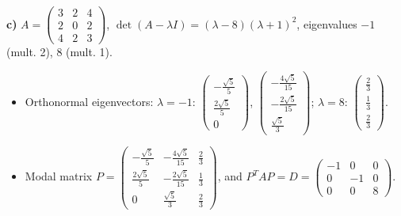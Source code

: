 \noindent\textbf{c)} $A=\begin{pmatrix}3 & 2 & 4 \\ 2 & 0 & 2 \\ 4 & 2 & 3\end{pmatrix}$, $\det(A-\lambda I)=\left(\lambda - 8\right) \left(\lambda + 1\right)^{2}$, eigenvalues $-1$ (mult. 2), $8$ (mult. 1).
\begin{itemize}\item Orthonormal eigenvectors: $\lambda=-1$: $\begin{pmatrix}- \frac{\sqrt{5}}{5} \\ \frac{2 \sqrt{5}}{5} \\ 0\end{pmatrix}$, $\begin{pmatrix}- \frac{4 \sqrt{5}}{15} \\ - \frac{2 \sqrt{5}}{15} \\ \frac{\sqrt{5}}{3}\end{pmatrix}$; $\lambda=8$: $\begin{pmatrix}\frac{2}{3} \\ \frac{1}{3} \\ \frac{2}{3}\end{pmatrix}$.
\item Modal matrix $P=\begin{pmatrix}- \frac{\sqrt{5}}{5} & - \frac{4 \sqrt{5}}{15} & \frac{2}{3} \\ \frac{2 \sqrt{5}}{5} & - \frac{2 \sqrt{5}}{15} & \frac{1}{3} \\ 0 & \frac{\sqrt{5}}{3} & \frac{2}{3}\end{pmatrix}$, and $P^TAP=D=\begin{pmatrix}-1 & 0 & 0 \\ 0 & -1 & 0 \\ 0 & 0 & 8\end{pmatrix}$.\end{itemize}

